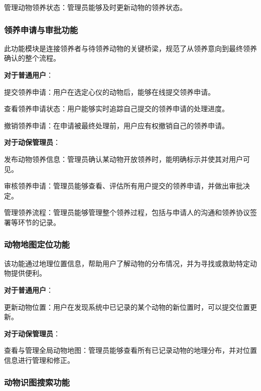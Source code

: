 \documentclass[12pt,a4paper,UTF8]{article}
\begin{document}
管理动物领养状态：管理员能够及时更新动物的领养状态。

\subsubsection{领养申请与审批功能}

此功能模块是连接领养者与待领养动物的关键桥梁，规范了从领养意向到最终领养确认的整个流程。

\vspace{0.25cm}

\noindent\textbf{对于普通用户}：

提交领养申请：用户在选定心仪的动物后，能够在线提交领养申请。

查看领养申请状态：用户能够实时追踪自己提交的领养申请的处理进度。

撤销领养申请：在申请被最终处理前，用户应有权撤销自己的领养申请。

\vspace{0.25cm}

\noindent\textbf{对于动保管理员}：

发布动物领养信息：管理员确认某动物开放领养时，能明确标示并使其对用户可见。

审核领养申请：管理员能够查看、评估所有用户提交的领养申请，并做出审批决定。

管理领养流程：管理员能够管理整个领养过程，包括与申请人的沟通和领养协议签署等环节的记录。

\subsubsection{动物地图定位功能}

该功能通过地理位置信息，帮助用户了解动物的分布情况，并为寻找或救助特定动物提供便利。

\vspace{0.25cm}

\noindent\textbf{对于普通用户}：

更新动物位置：用户在发现系统中已记录的某个动物的新位置时，可以提交位置更新。

\vspace{0.25cm}

\noindent\textbf{对于动保管理员}：

查看与管理全局动物地图：管理员能够查看所有已记录动物的地理分布，并对位置信息进行管理和修正。

\subsubsection{动物识图搜索功能}
\end{document}
